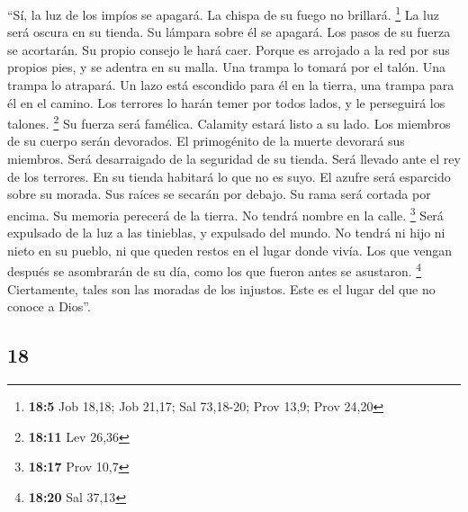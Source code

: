 \begin{paracol}{2}
 ``Sí, la luz de los impíos se apagará. La chispa de su
fuego no brillará. \footnote{\textbf{18:5} Job 18,18; Job 21,17; Sal
  73,18-20; Prov 13,9; Prov 24,20}  La luz será oscura en
su tienda. Su lámpara sobre él se apagará.  Los pasos de
su fuerza se acortarán. Su propio consejo le hará caer. 
Porque es arrojado a la red por sus propios pies, y se adentra en su
malla.  Una trampa lo tomará por el talón. Una trampa lo
atrapará.  Un lazo está escondido para él en la tierra,
una trampa para él en el camino.  Los terrores lo harán
temer por todos lados, y le perseguirá los talones. \footnote{\textbf{18:11}
  Lev 26,36}  Su fuerza será famélica. Calamity estará
listo a su lado.  Los miembros de su cuerpo serán
devorados. El primogénito de la muerte devorará sus miembros.
 Será desarraigado de la seguridad de su tienda. Será
llevado ante el rey de los terrores.  En su tienda
habitará lo que no es suyo. El azufre será esparcido sobre su morada.
 Sus raíces se secarán por debajo. Su rama será cortada
por encima.  Su memoria perecerá de la tierra. No tendrá
nombre en la calle. \footnote{\textbf{18:17} Prov 10,7} 
Será expulsado de la luz a las tinieblas, y expulsado del mundo.
 No tendrá ni hijo ni nieto en su pueblo, ni que queden
restos en el lugar donde vivía.  Los que vengan después
se asombrarán de su día, como los que fueron antes se asustaron.
\footnote{\textbf{18:20} Sal 37,13}  Ciertamente, tales
son las moradas de los injustos. Este es el lugar del que no conoce a
Dios''.

\switchcolumn
\begin{otherlanguage}{english}

\hypertarget{section-35}{%
\section{18}\label{section-35}}


\end{otherlanguage}
\end{paracol}
